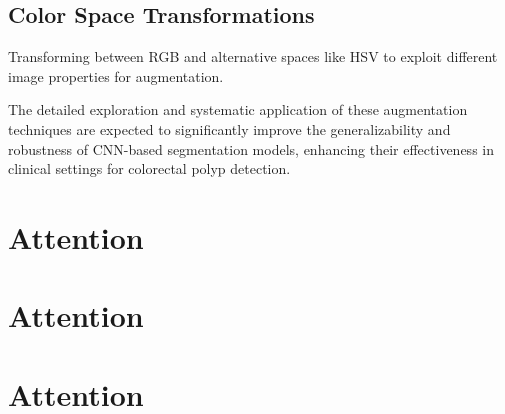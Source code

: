 \subsection{Color Space Transformations}
Transforming between RGB and alternative spaces like HSV to exploit different image properties for augmentation.

The detailed exploration and systematic application of these augmentation techniques are expected to significantly improve the generalizability and robustness of CNN-based segmentation models, enhancing their effectiveness in clinical settings for colorectal polyp detection.

\section{Attention}
\section{Attention}
\section{Attention}